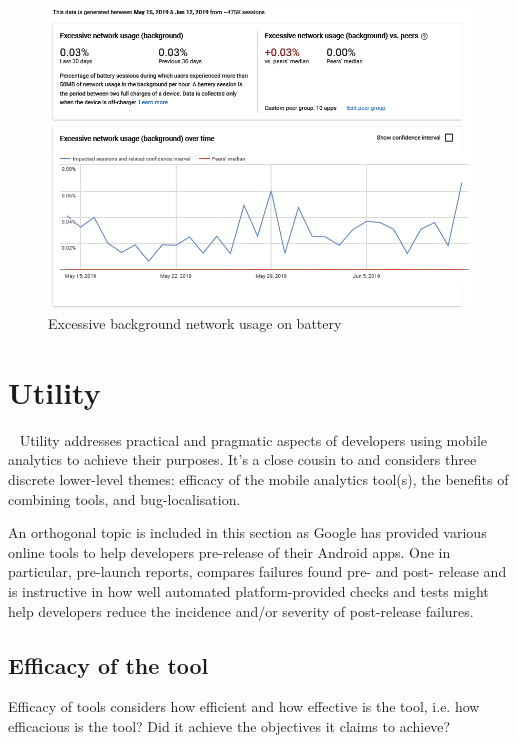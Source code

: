 
\begin{figure}[!htbp]
    \centering
    \includegraphics[width=\textwidth, keepaspectratio]{images/android-vitals-screenshots/Excessive_network_usage_by_kiwix_15_jun_2019.png}
    \caption{Excessive background network usage on battery}
    \label{fig:android_vitals_excessive_network_usage}
\end{figure}


\section{Utility}~\label{section-utility}
Utility addresses practical and pragmatic aspects of developers using mobile analytics to achieve their purposes. It's a close cousin to  and considers three discrete lower-level themes: efficacy of the mobile analytics tool(s), the benefits of combining tools, and bug-localisation.

An orthogonal topic is included in this section as Google has provided various online tools to help developers pre-release of their Android apps. One in particular, pre-launch reports, compares failures found pre- and post- release and is instructive in how well automated platform-provided checks and tests might help developers reduce the incidence and/or severity of post-release failures.


\subsection{Efficacy of the tool}
Efficacy of tools considers how efficient and how effective is the tool, i.e. how efficacious is the tool? Did it achieve the objectives it claims to achieve?

